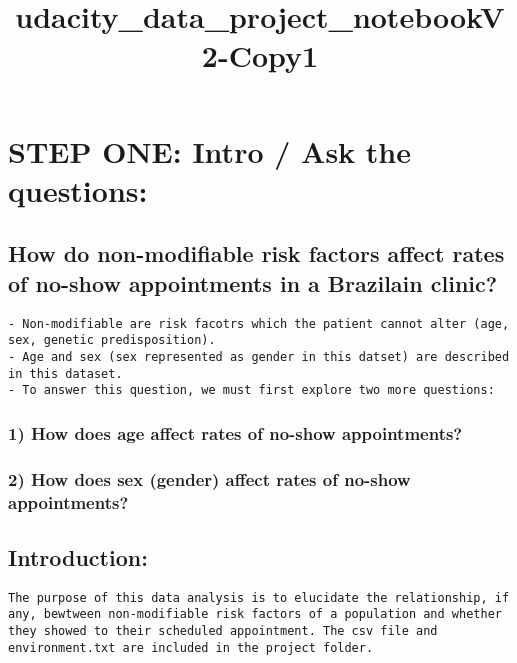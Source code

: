 \documentclass[11pt]{article}
\title{udacity\_data\_project\_notebookV2-Copy1}
\begin{document}
    
    
    \maketitle
    
    

    
    \section{STEP ONE: Intro / Ask the
questions:}\label{step-one-intro-ask-the-questions}

    \subsection{How do non-modifiable risk factors affect rates of no-show
appointments in a Brazilain
clinic?}\label{how-do-non-modifiable-risk-factors-affect-rates-of-no-show-appointments-in-a-brazilain-clinic}

\begin{verbatim}
- Non-modifiable are risk facotrs which the patient cannot alter (age, sex, genetic predisposition). 
- Age and sex (sex represented as gender in this datset) are described in this dataset. 
- To answer this question, we must first explore two more questions:
\end{verbatim}

\subsubsection{1) How does age affect rates of no-show
appointments?}\label{how-does-age-affect-rates-of-no-show-appointments}

\subsubsection{2) How does sex (gender) affect rates of no-show
appointments?}\label{how-does-sex-gender-affect-rates-of-no-show-appointments}

    \subsection{Introduction:}\label{introduction}

\begin{verbatim}
The purpose of this data analysis is to elucidate the relationship, if any, bewtween non-modifiable risk factors of a population and whether they showed to their scheduled appointment. The csv file and environment.txt are included in the project folder. 
\end{verbatim}
\end{document}
